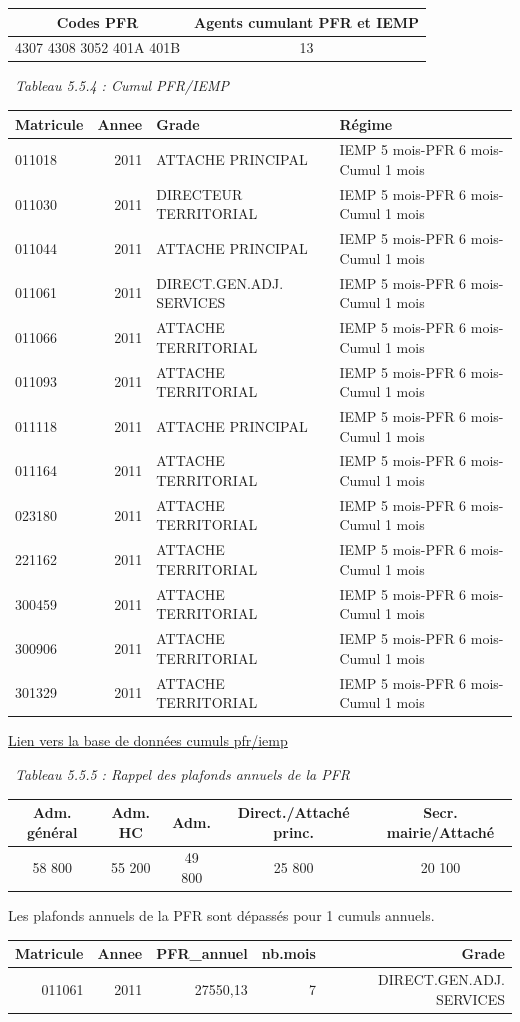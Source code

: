 \begin{longtable}[]{@{}cc@{}}
\toprule
Codes PFR & Agents cumulant PFR et IEMP\tabularnewline
\midrule
\endhead
4307 4308 3052 401A 401B & 13\tabularnewline
\bottomrule
\end{longtable}

~\emph{Tableau 5.5.4 : Cumul PFR/IEMP}

\begin{longtable}[]{@{}lrll@{}}
\toprule
Matricule & Annee & Grade & Régime\tabularnewline
\midrule
\endhead
011018 & 2011 & ATTACHE PRINCIPAL & IEMP 5 mois-PFR 6 mois-Cumul 1
mois\tabularnewline
011030 & 2011 & DIRECTEUR TERRITORIAL & IEMP 5 mois-PFR 6 mois-Cumul 1
mois\tabularnewline
011044 & 2011 & ATTACHE PRINCIPAL & IEMP 5 mois-PFR 6 mois-Cumul 1
mois\tabularnewline
011061 & 2011 & DIRECT.GEN.ADJ. SERVICES & IEMP 5 mois-PFR 6 mois-Cumul
1 mois\tabularnewline
011066 & 2011 & ATTACHE TERRITORIAL & IEMP 5 mois-PFR 6 mois-Cumul 1
mois\tabularnewline
011093 & 2011 & ATTACHE TERRITORIAL & IEMP 5 mois-PFR 6 mois-Cumul 1
mois\tabularnewline
011118 & 2011 & ATTACHE PRINCIPAL & IEMP 5 mois-PFR 6 mois-Cumul 1
mois\tabularnewline
011164 & 2011 & ATTACHE TERRITORIAL & IEMP 5 mois-PFR 6 mois-Cumul 1
mois\tabularnewline
023180 & 2011 & ATTACHE TERRITORIAL & IEMP 5 mois-PFR 6 mois-Cumul 1
mois\tabularnewline
221162 & 2011 & ATTACHE TERRITORIAL & IEMP 5 mois-PFR 6 mois-Cumul 1
mois\tabularnewline
300459 & 2011 & ATTACHE TERRITORIAL & IEMP 5 mois-PFR 6 mois-Cumul 1
mois\tabularnewline
300906 & 2011 & ATTACHE TERRITORIAL & IEMP 5 mois-PFR 6 mois-Cumul 1
mois\tabularnewline
301329 & 2011 & ATTACHE TERRITORIAL & IEMP 5 mois-PFR 6 mois-Cumul 1
mois\tabularnewline
\bottomrule
\end{longtable}

\href{../Bases/Reglementation/personnels.pfr.iemp.csv}{Lien vers la base de
données cumuls pfr/iemp}

~\emph{Tableau 5.5.5 : Rappel des plafonds annuels de la PFR}

\begin{longtable}[]{@{}ccccc@{}}
\toprule
Adm. général & Adm. HC & Adm. & Direct./Attaché princ. & Secr.
mairie/Attaché\tabularnewline
\midrule
\endhead
58 800 & 55 200 & 49 800 & 25 800 & 20 100\tabularnewline
\bottomrule
\end{longtable}

Les plafonds annuels de la PFR sont dépassés pour 1 cumuls annuels.

\begin{longtable}[]{@{}rrrrr@{}}
\toprule
Matricule & Annee & PFR\_annuel & nb.mois & Grade\tabularnewline
\midrule
\endhead
011061 & 2011 & 27550,13 & 7 & DIRECT.GEN.ADJ. SERVICES\tabularnewline
\bottomrule
\end{longtable}

